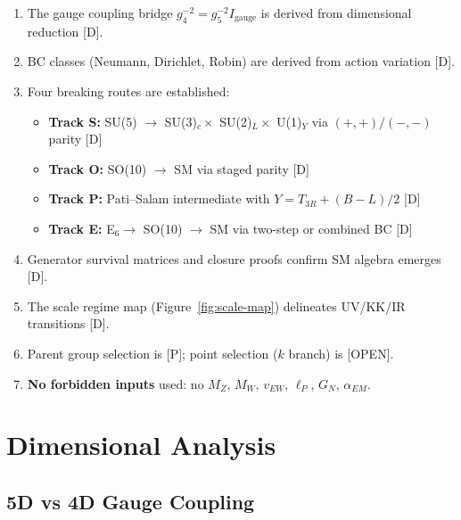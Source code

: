 \documentclass[11pt,a4paper]{article}
\begin{document}
\begin{enumerate}
  \item The gauge coupling bridge $g_4^{-2} = g_5^{-2} I_{\text{gauge}}$ is derived
        from dimensional reduction [D].

  \item BC classes (Neumann, Dirichlet, Robin) are derived from action variation [D].

  \item Four breaking routes are established:
  \begin{itemize}
    \item \textbf{Track S:} SU(5) $\to$ SU(3)$_c \times$ SU(2)$_L \times$ U(1)$_Y$
          via $(+,+)/(-,-)$ parity [D]
    \item \textbf{Track O:} SO(10) $\to$ SM via staged parity [D]
    \item \textbf{Track P:} Pati--Salam intermediate with $Y = T_{3R} + (B-L)/2$ [D]
    \item \textbf{Track E:} E$_6 \to$ SO(10) $\to$ SM via two-step or combined BC [D]
  \end{itemize}

  \item Generator survival matrices and closure proofs confirm SM algebra emerges [D].

  \item The scale regime map (Figure~\ref{fig:scale-map}) delineates UV/KK/IR transitions [D].

  \item Parent group selection is [P]; point selection ($k$ branch) is [OPEN].

  \item \textbf{No forbidden inputs} used: no $M_Z$, $M_W$, $v_{EW}$, $\ell_P$, $G_N$, $\alpha_{EM}$.
\end{enumerate}

\appendix

\section{Dimensional Analysis}
\label{app:dimensions}

\subsection{5D vs 4D Gauge Coupling}
\end{document}
